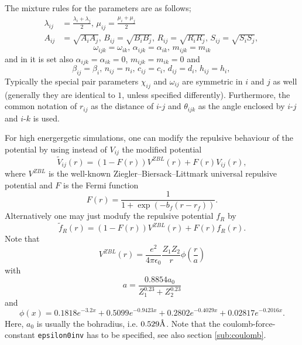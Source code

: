 The mixture rules for the parameters are as follows;
\begin{equation}\label{equ:TersoffMixingRules}
  \begin{split}
    \lambda_{ij} & = \frac{\lambda_i+\lambda_j}{2} , \, \mu_{ij} = \frac{\mu_i+\mu_j}{2}\\
    A_{ij} & = \sqrt{A_iA_j} , \,
    B_{ij} = \sqrt{B_iB_j} , \,
    R_{ij} = \sqrt{R_iR_j} , \,
    S_{ij} = \sqrt{S_iS_j}  , \,
  \end{split}
\end{equation}
\begin{equation}\label{equ:TersoffMixingRules3}
  \omega_{ijk} = \omega_{ik}, \, \alpha_{ijk} = \alpha_{ik}, \, m_{ijk} = m_{ik} 
\end{equation}
and in \cite{tersoff89} it is set also $\alpha_{ijk}=\alpha_{ik}=0$, $m_{ijk}=m_{ik}=0$ and
\begin{equation}\label{equ:TersoffMixingRules2}
  \beta_{ij} = \beta_i , \,
  n_{ij} = n_{i} , \, 
  c_{ij} = c_i , \,
  d_{ij} = d_i , \,
  h_{ij} = h_i , \,
\end{equation}
Typically the special pair parameters $\chi_{ij}$ and $\omega_{ij}$ are symmetric in $i$ and $j$ as well (generally they are identical to $1$, unless specified differently). Furthermore, the common notation of $r_{ij}$ as the distance of $i$-$j$ and $\theta_{ijk}$ as the angle enclosed by  $i$-$j$ and $i$-$k$ is used.

For high energergetic simulations, one can modify the repulsive behaviour of the potential by
using instead of $V_{ij}$ the modified potential 
\begin{equation}\label{equ:TersoffZBLType2}
  \tilde{V}_{ij}(r) =  (1-F(r))V^{ZBL}(r)+F(r)V_{ij}(r),
\end{equation}
where $V^{ZBL}$ is the well-known Ziegler–Biersack–Littmark universal repulsive
potential \cite{ziegler1985stopping} and $F$ is the Fermi function
\begin{equation*}
  F(r)=\frac{1}{1+\exp(-b_f(r-r_f))}.
\end{equation*}
Alternatively one may just modufy the repulsive potential $f_R$ by 
\begin{equation}\label{equ:TersoffZBLType1}
  \tilde{f}_{R}(r) =  (1-F(r))V^{ZBL}(r)+F(r)f_{R}(r).
\end{equation}
Note that 
\begin{equation*}
  V^{ZBL}(r) = \frac{e^2}{4\pi\epsilon_0}\frac{Z_1 Z_2}{r} \phi\left(\frac{r}{a}\right)
\end{equation*}
with
\begin{equation*}
  a = \frac{0.8854 a_0}{Z_1^{0.23}+Z_2^{0.23}}
\end{equation*}
and
\begin{equation*}
  \phi(x) = 0.1818e^{-3.2 x}+0.5099e^{-0.9423 x}+0.2802e^{-0.4029 x}+0.02817e^{-0.2016 x}.
\end{equation*}
Here, $a_0$ is usually the bohradius, i.e. $0.529 \text{\normalfont\AA}$. Note that the coulomb-force-constant \verb+epsilon0inv+ has to be specified, see also section \ref{sub:coulomb}.

